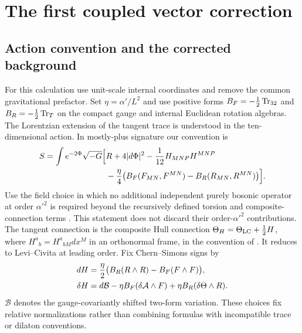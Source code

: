 \section{The first coupled vector correction}\label{sec:coupled}

\subsection{Action convention and the corrected background}
For this calculation use unit-scale internal coordinates and remove the
common gravitational prefactor. Set $\eta=\alpha'/L^2$ and use positive
forms $B_F=-\tfrac12\operatorname{Tr}_{32}$ and $B_R=-\tfrac12\operatorname{Tr}_T$ on
the compact gauge and internal Euclidean rotation algebras. The
Lorentzian extension of the tangent trace is understood in the
ten-dimensional action. In mostly-plus signature our convention is
\begin{equation}\label{eq:heterotic-action}
 \begin{split}
 S=\int e^{-2\Phi}\sqrt{-G}\Bigl[&
 R+4|d\Phi|^2-\frac1{12}H_{MNP}H^{MNP}\\
 &-\frac\eta4\bigl(B_F(F_{MN},F^{MN})-B_R(R_{MN},R^{MN})\bigr)
 \Bigr].
 \end{split}
\end{equation}
Use the field choice in which no additional independent purely bosonic
operator at order $\alpha'^2$ is required beyond the recursively defined
torsion and composite-connection terms \cite{bdr,aqs}. This statement
does not discard their order-$\alpha'^2$ contributions. The tangent
connection is the composite Hull connection
$\Theta_H=\Theta_{\rm LC}+\tfrac12H$, where
$H^a{}_b=H^a{}_{bM}dx^M$ in an orthonormal frame, in the convention
of \cite[section~2.1]{mcorist_yin}. It reduces to Levi--Civita at leading order.
Fix Chern--Simons signs by
\begin{align}
 dH&=\frac\eta2\bigl(B_R(R\wedge R)-B_F(F\wedge F)\bigr),
 \label{eq:Bianchi}\\
 \delta H&=d\mathcal B-\eta B_F(\delta\mathcal A\wedge F)
                  +\eta B_R(\delta\Theta\wedge R).
 \label{eq:Hvariation}
\end{align}
$\mathcal B$ denotes the gauge-covariantly shifted two-form variation.
These choices fix relative normalizations rather than combining formulas
with incompatible trace or dilaton conventions.

